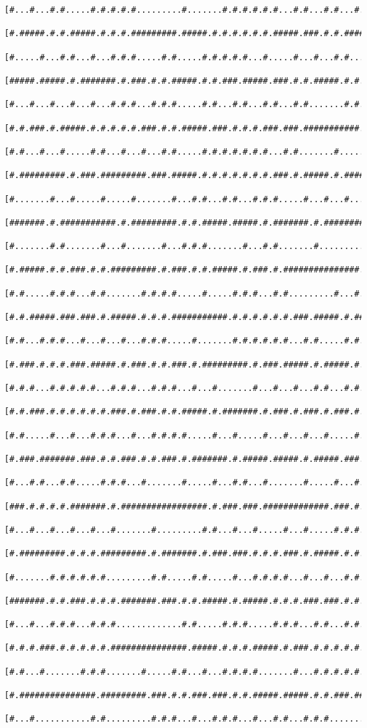 \documentclass[a4paper,10pt,ngerman]{scrartcl}
\begin{document}
\begin{lstlisting}[frame=tb]
 [#...#...#.#.....#.#.#.#.#.........#.......#.#.#.#.#.#...#.#...#.#...#...#...#.#.#]
 [#.#####.#.#.#####.#.#.#.#########.#####.#.#.#.#.#.#.#####.###.#.#.#######.###.#.#]
 [#.....#...#.#...#...#.#.#.....#.#.....#.#.#.#.#...#.....#...#...#.#.......#...#.#]
 [#####.#####.#.#######.#.###.#.#.#####.#.#.###.#####.###.#.#.#####.#.#.#######.#.#]
 [#...#...#...#...#...#.#.#...#.#.#.....#.#...#.#...#.#...#.#.......#.#.#.......#.#]
 [#.#.###.#.#####.#.#.#.#.#.###.#.#.#####.###.#.#.#.###.###.###########.#.#####.#.#]
 [#.#...#...#.....#.#...#...#...#.#.....#.#.#.#.#.#.#...#.#.......#.....#...#...#.#]
 [#.#########.#.###.#########.###.#####.#.#.#.#.#.#.#.###.#.#####.#.#####.#.#####.#]
 [#.......#...#.....#.....#.......#...#.#...#.#...#.#.#.....#...#...#.....#.......#]
 [#######.#.###########.#.#########.#.#.#####.#####.#.#######.#.###################]
 [#.......#.#.......#...#.......#...#.#.#.......#...#.#.......#.............#.....#]
 [#.#####.#.#.###.#.#.#########.#.###.#.#.#####.#.###.#.###############.###.#.###.#]
 [#.#.....#.#.#...#.#.......#.#.#.#.....#.....#.#.#...#.#.........#...#...#...#.#.#]
 [#.#.#####.###.###.#.#####.#.#.#.###########.#.#.#.#.#.#.###.#####.#.###.#####.#.#]
 [#.#...#.#.#...#...#...#...#.#.#.....#.......#.#.#.#.#.#...#.#.....#.#.#.#.....#.#]
 [#.###.#.#.#.###.#####.#.###.#.#.###.#.#########.#.###.#####.#.#####.#.#.###.###.#]
 [#.#.#...#.#.#.#.#...#.#.#...#.#.#...#...#.......#...#...#...#.#...#.#.#.#...#...#]
 [#.#.###.#.#.#.#.#.#.###.#.###.#.#.#####.#.#######.#.###.#.###.#.###.#.#.#.#.#.#.#]
 [#.#.....#...#...#.#.#...#...#.#.#.#.....#...#.....#...#...#...#.....#.#...#.#.#.#]
 [#.###.#######.###.#.#.###.#.#.###.#.#######.#.#####.#####.#.#####.###.#####.#.###]
 [#...#.#...#.#.....#.#.#...#.......#.....#...#.#...#.......#.....#...#.#...#.#...#]
 [###.#.#.#.#.#######.#.#################.#.###.###.#############.###.#.#.#.#.###.#]
 [#...#...#...#...#...#.......#.........#.#...#...#.....#...#.....#.#.#...#.#.#...#]
 [#.#########.#.#.#.#########.#.#######.#.###.###.#.#.#.###.#.#####.#.#.###.#.#.###]
 [#.......#.#.#.#.#.#.........#.#.....#.#.....#...#.#.#.#...#...#...#.#.#.#...#...#]
 [#######.#.#.###.#.#.#.#######.###.#.#.#####.#.#####.#.#.#.###.###.#.#.#.#######.#]
 [#...#...#.#.#...#.#.#.............#.#.....#.#.#.....#.#.#...#.#...#.#.....#...#.#]
 [#.#.#.###.#.#.#.#.#.###############.#####.#.#.#.#####.#.###.#.#.#.#.#.#####.#.#.#]
 [#.#...#.......#.#.#.......#.....#.#...#...#.#.#.#.......#...#.#.#.#.#.#.....#.#.#]
 [#.###############.#########.###.#.#.###.###.#.#.#####.#####.#.#.###.###.#####.#.#]
 [#...#...........#.#.........#.#.#...#...#.#.#...#...#.#...#.#.#.........#...#...#]

\end{lstlisting}
\end{document}
